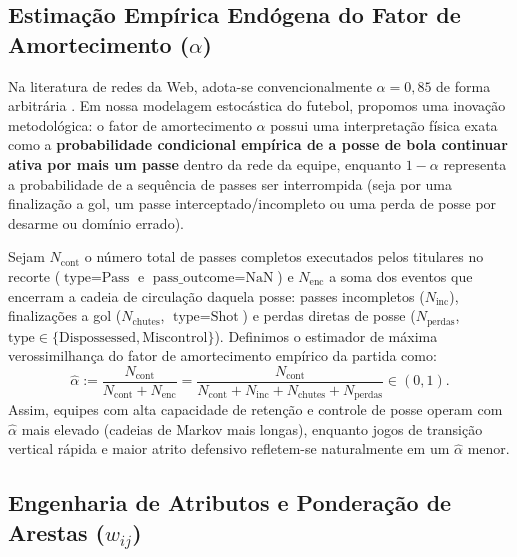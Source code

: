 \documentclass[10pt,a4paper]{article}
\theoremstyle{definition}
\theoremstyle{plain}
\theoremstyle{remark}
\begin{document}
\subsection{\sffamily Estimação Empírica Endógena do Fator de Amortecimento (\texorpdfstring{$\alpha$}{alpha})}

Na literatura de redes da Web, adota-se convencionalmente $\alpha = 0{,}85$ de forma arbitrária \cite{brin1998}. Em nossa modelagem estocástica do futebol, propomos uma inovação metodológica: o fator de amortecimento $\alpha$ possui uma interpretação física exata como a \textbf{probabilidade condicional empírica de a posse de bola continuar ativa por mais um passe} dentro da rede da equipe, enquanto $1 - \alpha$ representa a probabilidade de a sequência de passes ser interrompida (seja por uma finalização a gol, um passe interceptado/incompleto ou uma perda de posse por desarme ou domínio errado).

Sejam $N_{\text{cont}}$ o número total de passes completos executados pelos titulares no recorte ($\text{type} = \text{Pass}$ e $\text{pass\_outcome} = \text{NaN}$) e $N_{\text{enc}}$ a soma dos eventos que encerram a cadeia de circulação daquela posse: passes incompletos ($N_{\text{inc}}$), finalizações a gol ($N_{\text{chutes}}$, $\text{type} = \text{Shot}$) e perdas diretas de posse ($N_{\text{perdas}}$, $\text{type} \in \{\text{Dispossessed}, \text{Miscontrol}\}$). Definimos o estimador de máxima verossimilhança do fator de amortecimento empírico da partida como:
\begin{equation}
\hat{\alpha} := \frac{N_{\text{cont}}}{N_{\text{cont}} + N_{\text{enc}}} = \frac{N_{\text{cont}}}{N_{\text{cont}} + N_{\text{inc}} + N_{\text{chutes}} + N_{\text{perdas}}} \in (0, 1).
\label{eq:alpha_empirico}
\end{equation}
Assim, equipes com alta capacidade de retenção e controle de posse operam com $\hat{\alpha}$ mais elevado (cadeias de Markov mais longas), enquanto jogos de transição vertical rápida e maior atrito defensivo refletem-se naturalmente em um $\hat{\alpha}$ menor.

\subsection{\sffamily Engenharia de Atributos e Ponderação de Arestas (\texorpdfstring{$w_{ij}$}{w\_ij})}
\end{document}
